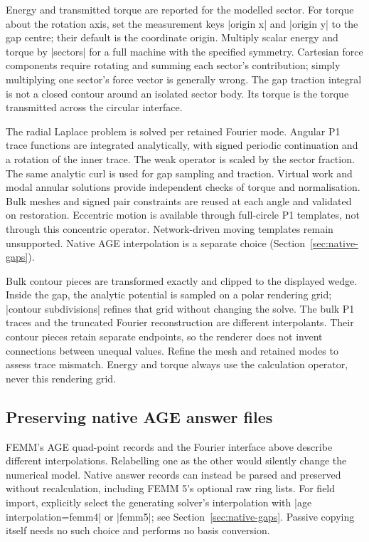 Energy and transmitted torque are reported for the modelled sector. For torque
about the rotation axis, set the measurement keys |origin x| and |origin y| to
the gap centre; their default is the coordinate origin. Multiply
scalar energy and torque by |sectors| for a full machine with the specified
symmetry. Cartesian force components require rotating and summing each sector's
contribution; simply multiplying one sector's force vector is generally wrong.
The gap traction integral is not a closed contour around an isolated sector body.
Its torque is the torque transmitted across the circular interface.

The radial Laplace problem is solved per retained Fourier mode. Angular P1 trace
functions are integrated analytically, with signed periodic continuation and a
rotation of the inner trace. The weak operator is scaled by the sector fraction.
The same analytic curl is used for gap sampling and traction. Virtual work and
modal annular solutions provide independent checks of torque and normalisation.
Bulk meshes and signed pair constraints are reused at each angle and validated
on restoration. Eccentric motion is available through full-circle P1 templates, not through
this concentric operator. Network-driven moving templates remain unsupported.
Native AGE interpolation is a separate choice (Section~\ref{sec:native-gaps}).

Bulk contour pieces are transformed exactly and clipped to the displayed wedge.
Inside the gap, the analytic potential is sampled on a polar rendering grid;
|contour subdivisions| refines that grid without changing the solve.
The bulk P1 traces and the truncated Fourier reconstruction are different
interpolants. Their contour pieces retain separate endpoints, so the renderer
does not invent connections between unequal values. Refine the mesh and retained
modes to assess trace mismatch. Energy and torque always use the calculation
operator, never this rendering grid.

\subsection{Preserving native AGE answer files}
FEMM's AGE quad-point records and the Fourier interface above describe different
interpolations. Relabelling one as the other would silently change the numerical
model. Native answer records can instead be parsed and preserved without
recalculation, including FEMM 5's optional raw ring lists. For field import, explicitly select the generating solver's interpolation
with |age interpolation=femm4| or |femm5|; see Section~\ref{sec:native-gaps}.
Passive copying itself needs no such choice and performs no basis conversion.

